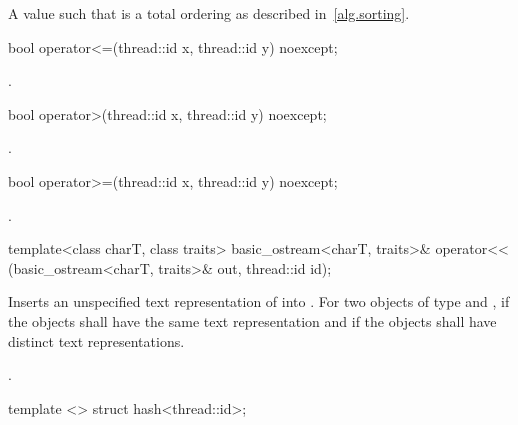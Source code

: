 \begin{itemdescr}
\pnum
\returns A value such that  is a total ordering as described in~\ref{alg.sorting}.
\end{itemdescr}

%
\begin{itemdecl}
bool operator<=(thread::id x, thread::id y) noexcept;
\end{itemdecl}

\begin{itemdescr}
\pnum
\returns {}.
\end{itemdescr}

%
\begin{itemdecl}
bool operator>(thread::id x, thread::id y) noexcept;
\end{itemdecl}

\begin{itemdescr}
\pnum\returns {}.
\end{itemdescr}

%
\begin{itemdecl}
bool operator>=(thread::id x, thread::id y) noexcept;
\end{itemdecl}

\begin{itemdescr}
\pnum\returns {}.
\end{itemdescr}

%
\begin{itemdecl}
template<class charT, class traits>
  basic_ostream<charT, traits>&
    operator<< (basic_ostream<charT, traits>& out, thread::id id);
\end{itemdecl}

\begin{itemdescr}
\pnum\effects Inserts an unspecified text representation of  into
. For two objects of type   and ,
if  the  objects shall have the same text
representation and if  the  objects shall have
distinct text representations.

\pnum\returns {}.
\end{itemdescr}

%
\begin{itemdecl}
template <> struct hash<thread::id>;
\end{itemdecl}

